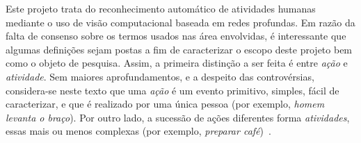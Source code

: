 \nocite{jegham-2020, hussain-2020,yao-2019,kongr-2018,herath-2017}
Este projeto trata do reconhecimento automático de atividades humanas mediante o uso de visão computacional baseada em redes profundas. Em razão da falta de consenso sobre os termos usados nas área envolvidas, é interessante que algumas definições sejam postas a fim de caracterizar o escopo deste projeto bem como o objeto de pesquisa. 
Assim, a primeira distinção a ser feita é entre \emph{ação} e \emph{atividade}. Sem maiores aprofundamentos, e a despeito das controvérsias, considera-se neste texto que uma \emph{ação} é um evento primitivo, simples, fácil de caracterizar, e que é realizado por uma única pessoa (por exemplo, \emph{homem levanta o braço}). Por outro lado, a sucessão de ações diferentes forma \emph{atividades}, essas mais ou menos complexas (por exemplo, \emph{preparar café})~\parencite{herath-2017}.


